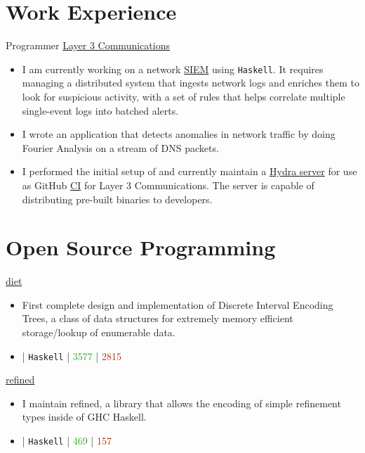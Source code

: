 \documentclass[10pt,letterpaper,sans]{moderncv}
\newcommand{\wlink}[2]{\textcolor[HTML]{461645}{\href{#1}{#2}}}
\newcommand{\ghlink}[2]{\wlink{https://github.com/#1}{#2}}
\newcommand{\ghrepo}[1]{\ghlink{#1}{\faGithub}}
\newcommand{\ghlang}[1]{\texttt{#1}}
\newcommand{\ghadd}[1]{\textcolor[HTML]{30A622}{{\faPlusCircle} #1}}
\newcommand{\ghrem}[1]{\textcolor[HTML]{BD2C00}{{\faMinusCircle} #1}}
\newcommand{\ghub}[4]{\ghrepo{#2} | \ghlang{#1} | \ghadd{#3} | \ghrem{#4}}
\newcommand{\lang}[1]{\texttt{#1}}
\begin{document}
\makecvtitle{}


\section{Work Experience}
        {Programmer}
        {\wlink{https://www.layer3com.com}{Layer 3 Communications}}
        {}{}
        {
\begin{itemize}
\item I am currently working on a network \wlink{https://en.wikipedia.org/wiki/Security_information_and_event_management}{SIEM} using \lang{Haskell}. It requires managing a distributed system that ingests network logs and enriches them to look for suspicious activity, with a set of rules that helps correlate multiple single-event logs into batched alerts.
\item I wrote an application that detects anomalies in network traffic by doing Fourier Analysis on a stream of DNS packets.
\item I performed the initial setup of and currently maintain a \wlink{https://github.com/NixOS/hydra}{Hydra server} for use as GitHub \wlink{https://en.wikipedia.org/wiki/Continuous_integration}{CI} for Layer 3 Communications. The server is capable of distributing pre-built binaries to developers.
\end{itemize}
}


\section{Open Source Programming}
\cventry{}
        {\wlink{https://github.com/chessai/diet}{diet}}
        {}{}{}
        {
\begin{itemize}
\item First complete design and implementation of Discrete Interval Encoding Trees, a class of data structures for extremely memory efficient storage/lookup of enumerable data.
\item \ghub{Haskell}{chessai/diet}{3577}{2815}
\end{itemize}
}

\cventry{}
        {\wlink{https://github.com/nikita-volkov/refined}{refined}}
        {}{}{}
        {
\begin{itemize}
\item I maintain refined, a library that allows the encoding of simple refinement types inside of GHC Haskell.
\item \ghub{Haskell}{nikita-volkov/refined}{469}{157}
\end{itemize}
}
\end{document}
